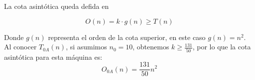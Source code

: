 La cota asintótica queda defida en 

\begin{equation}
    O(n) = k \cdot g(n) \geq T(n)
\end{equation}

Donde $g(n)$ representa el orden de la cota superior, en este caso $g(n) = n^2$.\\

Al conocer $T_{0A}(n)$, si asumimos $n_0 = 10$, obtenemos $k \geq \frac{131}{50}$, por lo que la cota asintótica para esta máquina es:
\begin{equation}
    O_{0A}(n) = \frac{131}{50} n^2
\end{equation}

